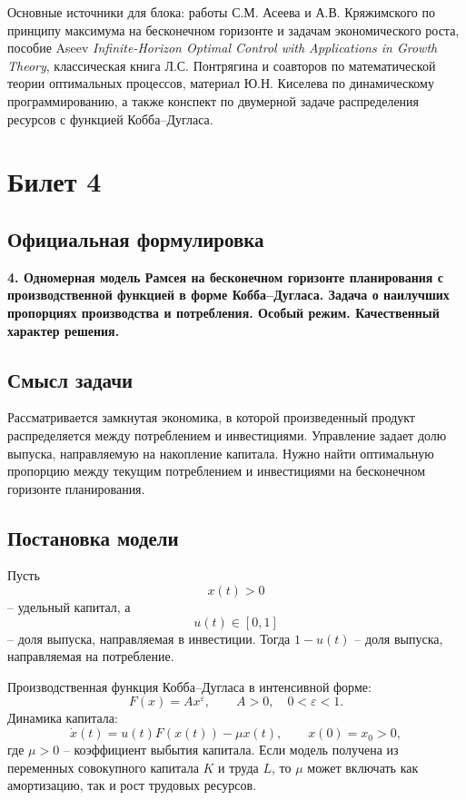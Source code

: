 \documentclass[12pt,a4paper]{article}
\newcommand{\eps}{\varepsilon}
\begin{document}
Основные источники для блока: работы С.М. Асеева и А.В. Кряжимского по принципу максимума на бесконечном горизонте и задачам экономического роста, пособие Aseev \textit{Infinite-Horizon Optimal Control with Applications in Growth Theory}, классическая книга Л.С. Понтрягина и соавторов по математической теории оптимальных процессов, материал Ю.Н. Киселева по динамическому программированию, а также конспект по двумерной задаче распределения ресурсов с функцией Кобба--Дугласа.

\newpage

\section{Билет 4}

\subsection*{Официальная формулировка}

\textbf{4. Одномерная модель Рамсея на бесконечном горизонте планирования с производственной функцией в форме Кобба--Дугласа. Задача о наилучших пропорциях производства и потребления. Особый режим. Качественный характер решения.}

\subsection{Смысл задачи}

Рассматривается замкнутая экономика, в которой произведенный продукт распределяется между потреблением и инвестициями. Управление задает долю выпуска, направляемую на накопление капитала. Нужно найти оптимальную пропорцию между текущим потреблением и инвестициями на бесконечном горизонте планирования.

\subsection{Постановка модели}

Пусть
\[
    x(t)>0
\]
-- удельный капитал, а
\[
    u(t)\in[0,1]
\]
-- доля выпуска, направляемая в инвестиции. Тогда \(1-u(t)\) -- доля выпуска, направляемая на потребление.

Производственная функция Кобба--Дугласа в интенсивной форме:
\[
    F(x)=Ax^{\eps},\qquad A>0,\quad 0<\eps<1.
\]
Динамика капитала:
\[
    \dot x(t)=u(t)F(x(t))-\mu x(t),\qquad x(0)=x_0>0,
\]
где \(\mu>0\) -- коэффициент выбытия капитала. Если модель получена из переменных совокупного капитала \(K\) и труда \(L\), то \(\mu\) может включать как амортизацию, так и рост трудовых ресурсов.
\end{document}
